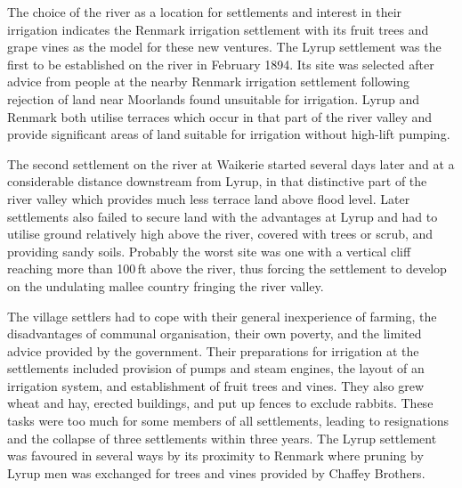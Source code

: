 The choice of the river as a location for settlements and interest in
their irrigation indicates the Renmark irrigation settlement with its
fruit trees and grape vines as the model for these new ventures.  The
Lyrup settlement was the first to be established on the river in
February 1894.  Its site was selected after advice from people at the
nearby Renmark irrigation settlement following rejection of land near
Moorlands found unsuitable for irrigation.  Lyrup and Renmark both
utilise terraces which occur in that part of the river valley and
provide significant areas of land suitable for irrigation without
high-lift pumping.

The second settlement on the river at Waikerie started several days
later and at a considerable distance downstream from Lyrup, in that
distinctive part of the river valley which provides much less terrace
land above flood level.  Later settlements also failed to secure land
with the advantages at Lyrup and had to utilise ground relatively high
above the river, covered with trees or scrub, and providing sandy
soils.  Probably the worst site was one with a vertical cliff reaching
more than 100\,ft above the river, thus forcing the settlement to
develop on the undulating mallee country fringing the river valley.

The village settlers had to cope with their general inexperience of
farming, the disadvantages of communal organisation, their own
poverty, and the limited advice provided by the government.  Their
preparations for irrigation at the settlements included provision of
pumps and steam engines, the layout of an irrigation system, and
establishment of fruit trees and vines.  They also grew wheat and hay,
erected buildings, and put up fences to exclude rabbits.  These tasks
were too much for some members of all settlements, leading to
resignations and the collapse of three settlements within three years.
The Lyrup settlement was favoured in several ways by its proximity to
Renmark where pruning by Lyrup men was exchanged for trees and vines
provided by Chaffey Brothers.


